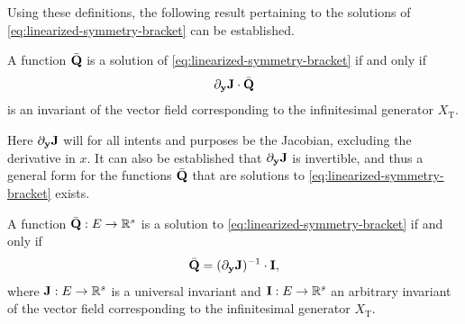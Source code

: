 Using these definitions, the following result pertaining to the solutions of \cref{eq:linearized-symmetry-bracket} can be established.
\begin{thm}
  A function \(\bar{\vb{Q}}\) is a solution of \cref{eq:linearized-symmetry-bracket} if and only if
  \begin{equation}
    \partial_{\vb{y}} \vb{J} \cdot \bar{\vb{Q}}
  \end{equation}
  is an invariant of the vector field corresponding to the infinitesimal generator \(X_{\text{T}}\).
\end{thm}
Here \(\partial_{\vb{y}} \vb{J}\) will for all intents and purposes be the Jacobian, excluding the derivative in \(x\).
It can also be established that \(\partial_{\vb{y}} \vb{J}\) is invertible, and thus a general form for the functions \(\bar{\vb{Q}}\) that are solutions to \cref{eq:linearized-symmetry-bracket} exists.
\begin{cor} \label{cor:reduced-characteristic-decomposition}
  A function \(\bar{\vb{Q}}: E \to \mathbb{R}^s\) is a solution to \cref{eq:linearized-symmetry-bracket} if and only if
  \begin{equation}
    \bar{\vb{Q}} = (\partial_{\vb{y}} \vb{J})^{-1} \cdot \vb{I},
  \end{equation}
  where \(\vb{J}: E \to \mathbb{R}^s\) is a universal invariant and \(\vb{I}: E \to \mathbb{R}^s\) an arbitrary invariant of the vector field corresponding to the infinitesimal generator \(X_{\text{T}}\).
\end{cor}
